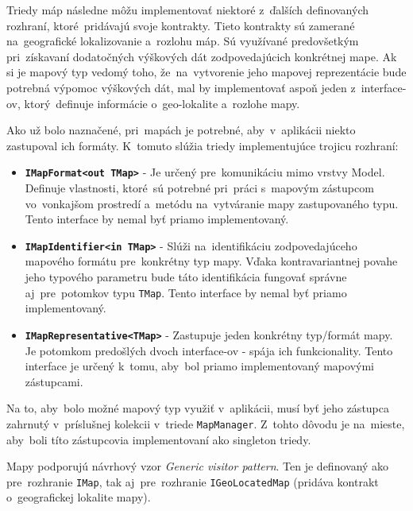 Triedy máp následne môžu implementovať niektoré z~ďalších definovaných rozhraní, ktoré~pridávajú svoje kontrakty. Tieto kontrakty sú zamerané na~geografické lokalizovanie a~rozlohu máp. Sú využívané predovšetkým pri~získavaní dodatočných výškových dát zodpovedajúcich konkrétnej mape. Ak si je mapový typ vedomý toho, že~na~vytvorenie jeho mapovej reprezentácie bude potrebná výpomoc výškových dát, mal by implementovať aspoň jeden z~interface-ov, ktorý~definuje informácie o~geo-lokalite a~rozlohe mapy.

Ako už bolo naznačené, pri~mapách je potrebné, aby~v~aplikácii niekto zastupoval ich formáty. K~tomuto slúžia triedy implementujúce trojicu rozhraní:
\begin{itemize}
    \item \textbf{\texttt{IMapFormat<out TMap>}} - Je určený pre~komunikáciu mimo vrstvy Model. Definuje vlastnosti, ktoré~sú potrebné pri~práci s~mapovým zástupcom vo~vonkajšom prostredí a~metódu na~vytváranie mapy zastupovaného typu. Tento interface by nemal byť priamo implementovaný.
    \item \textbf{\texttt{IMapIdentifier<in TMap>}} - Slúži na~identifikáciu zodpovedajúceho mapového formátu pre~konkrétny typ mapy. Vďaka kontravariantnej povahe jeho typového parametru bude táto identifikácia fungovať správne aj~pre~potomkov typu \texttt{TMap}. Tento interface by nemal byť priamo implementovaný.
    \item \textbf{\texttt{IMapRepresentative<TMap>}} - Zastupuje jeden konkrétny typ/formát mapy. Je potomkom predošlých dvoch interface-ov - spája ich funkcionality. Tento interface je určený k~tomu, aby~bol priamo implementovaný mapovými zástupcami.   
\end{itemize}

Na to, aby~bolo možné mapový typ využiť v~aplikácii, musí byť jeho zástupca zahrnutý v~príslušnej kolekcii v~triede \texttt{MapManager}. Z~tohto dôvodu je na~mieste, aby~boli títo zástupcovia implementovaní ako singleton triedy.

Mapy podporujú návrhový vzor \textit{Generic visitor pattern}. Ten je definovaný ako pre~rozhranie \texttt{IMap}, tak aj~pre~rozhranie \texttt{IGeoLocatedMap} (pridáva kontrakt o~geografickej lokalite mapy).

